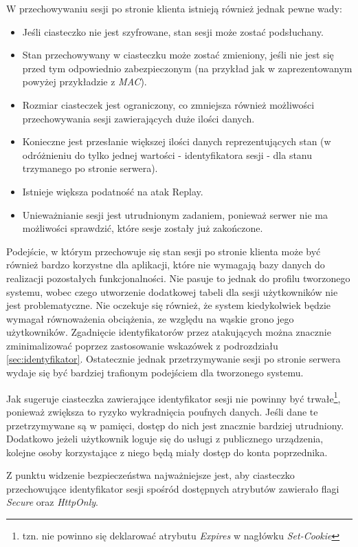 \documentclass[11pt]{aghdpl}
\begin{document}
W przechowywaniu sesji po stronie klienta istnieją również jednak pewne wady:
\begin{itemize}
\item Jeśli ciasteczko nie jest szyfrowane, stan sesji może zostać podsłuchany.
\item Stan przechowywany w ciasteczku może zostać zmieniony, jeśli nie jest się przed tym odpowiednio zabezpieczonym (na przykład jak w zaprezentowanym powyżej przykładzie z \emph{MAC}).
\item Rozmiar ciasteczek jest ograniczony, co zmniejsza również możliwości przechowywania sesji zawierających duże ilości danych.
\item Konieczne jest przesłanie większej ilości danych reprezentujących stan (w odróżnieniu do tylko jednej wartości - identyfikatora sesji - dla stanu trzymanego po stronie serwera).
\item Istnieje większa podatność na atak Replay.
\item Unieważnianie sesji jest utrudnionym zadaniem, ponieważ serwer nie ma możliwości sprawdzić, które sesje zostały już zakończone.
\end{itemize}

Podejście, w którym przechowuje się stan sesji po stronie klienta może być również bardzo korzystne dla aplikacji, które nie wymagają bazy danych do realizacji pozostałych funkcjonalności. Nie pasuje to jednak do profilu tworzonego systemu, wobec czego utworzenie dodatkowej tabeli dla sesji użytkowników nie jest problematyczne. Nie oczekuje się również, że system kiedykolwiek będzie wymagał równoważenia obciążenia, ze względu na wąskie grono jego użytkowników. Zgadnięcie identyfikatorów przez atakujących można znacznie zminimalizować poprzez zastosowanie wskazówek z podrozdziału \ref{sec:identyfikator}. Ostatecznie jednak przetrzymywanie sesji po stronie serwera wydaje się być bardziej trafionym podejściem dla tworzonego systemu.

Jak sugeruje \cite{ClAu} ciasteczka zawierające identyfikator sesji nie powinny być trwałe\footnote{tzn. nie powinno się deklarować atrybutu \emph{Expires} w nagłówku \emph{Set-Cookie}}, ponieważ zwiększa to ryzyko wykradnięcia poufnych danych. Jeśli dane te przetrzymywane są w pamięci, dostęp do nich jest znacznie bardziej utrudniony. Dodatkowo jeżeli użytkownik loguje się do usługi z publicznego urządzenia, kolejne osoby korzystające z niego będą miały dostęp do konta poprzednika.

Z punktu widzenie bezpieczeństwa najważniejsze jest, aby ciasteczko przechowujące identyfikator sesji spośród dostępnych atrybutów zawierało flagi \emph{Secure} oraz \emph{HttpOnly}.
\end{document}

